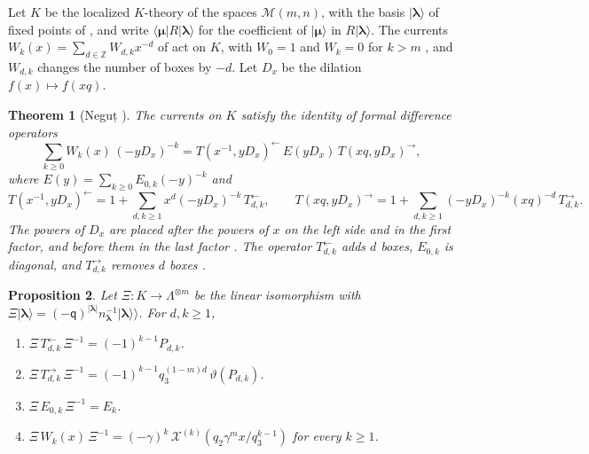 \documentclass[11pt]{amsart}
\newtheorem{theorem}{Theorem}[section]
\newtheorem{proposition}[theorem]{Proposition}
\theoremstyle{definition}
\theoremstyle{remark}
\newcommand{\Mq}{\mathsf q}                      %
\newcommand{\La}{\Lambda}                        %
\newcommand{\bl}{{\boldsymbol{\lambda}}}         %
\newcommand{\bmu}{{\boldsymbol{\mu}}}
\newcommand{\Newton}[1]{E_{#1}}                  %
\newcommand{\srcnorm}[1]{n_{#1}}                 %
\newcommand{\Gies}[2]{\mathcal M(#1,#2)}         %
\newcommand{\kket}[1]{\lvert #1\rangle\!\rangle} %
\newcommand{\Xk}[1]{\mathcal X^{(#1)}}           %
\newcommand{\Negut}{Neguț}
\begin{document}
Let \(K\) be the localized \(K\)-theory of the spaces \(\Gies{m}{n}\), with the basis \(|\bl\rangle\)
of fixed points of \cite[(3.6)]{N3}, and write \(\langle\bmu|R|\bl\rangle\) for the coefficient of
\(|\bmu\rangle\) in \(R|\bl\rangle\). The currents \(W_k(x)=\sum_{d\in\mathbb Z}W_{d,k}x^{-d}\) of
\cite[(2.48)]{N3} act on \(K\), with \(W_0=1\) and \(W_k=0\) for \(k>m\) \cite[(3.25)]{N3}, and
\(W_{d,k}\) changes the number of boxes by \(-d\).
Let \(D_x\) be the dilation \(f(x)\mapsto f(xq)\).

\begin{theorem}[\Negut{} \cite{N3}]\label{thm:negutfactorization}
The currents on \(K\) satisfy the identity of formal difference operators
\cite[Theorem~1.2]{N3}
\begin{equation}\label{eq:LDU}
 \sum_{k\geq0}W_k(x)\,(-yD_x)^{-k}
 =T(x^{-1},yD_x)^{\leftarrow}\,E(yD_x)\,T(xq,yD_x)^{\rightarrow},
\end{equation}
where \(E(y)=\sum_{k\geq0}E_{0,k}(-y)^{-k}\) and
\[
 T(x^{-1},yD_x)^{\leftarrow}=1+\sum_{d,k\geq1}x^d(-yD_x)^{-k}\,T^{\leftarrow}_{d,k},\qquad
 T(xq,yD_x)^{\rightarrow}=1+\sum_{d,k\geq1}(-yD_x)^{-k}(xq)^{-d}\,T^{\rightarrow}_{d,k}.
\]
The powers of \(D_x\) are placed after the powers of \(x\) on the left side and in the first
factor, and before them in the last factor \cite[Remark~2.17]{N3}. The operator
\(T^{\leftarrow}_{d,k}\) adds \(d\) boxes, \(E_{0,k}\) is diagonal, and \(T^{\rightarrow}_{d,k}\)
removes \(d\) boxes \cite[(2.50)--(2.55)]{N3}.
\end{theorem}

\begin{proposition}\label{prop:negutdictionary}
Let \(\Xi\colon K\to\La^{\otimes m}\) be the linear isomorphism with
\(\Xi|\bl\rangle=(-\Mq)^{|\bl|}\srcnorm{\bl}^{-1}\kket{\bl}\). For \(d,k\geq1\),
\begin{enumerate}
\item[(i)] \(\Xi\,T^{\leftarrow}_{d,k}\,\Xi^{-1}=(-1)^{k-1}P_{d,k}\).
\item[(ii)] \(\Xi\,T^{\rightarrow}_{d,k}\,\Xi^{-1}=(-1)^{k-1}q_3^{(1-m)d}\,\vartheta(P_{d,k})\).
\item[(iii)] \(\Xi\,E_{0,k}\,\Xi^{-1}=\Newton{k}\).
\item[(iv)] \(\Xi\,W_k(x)\,\Xi^{-1}=(-\gamma)^k\,\Xk{k}(q_2\gamma^mx/q_3^{k-1})\) for every \(k\geq1\).
\end{enumerate}
\end{proposition}
\end{document}
